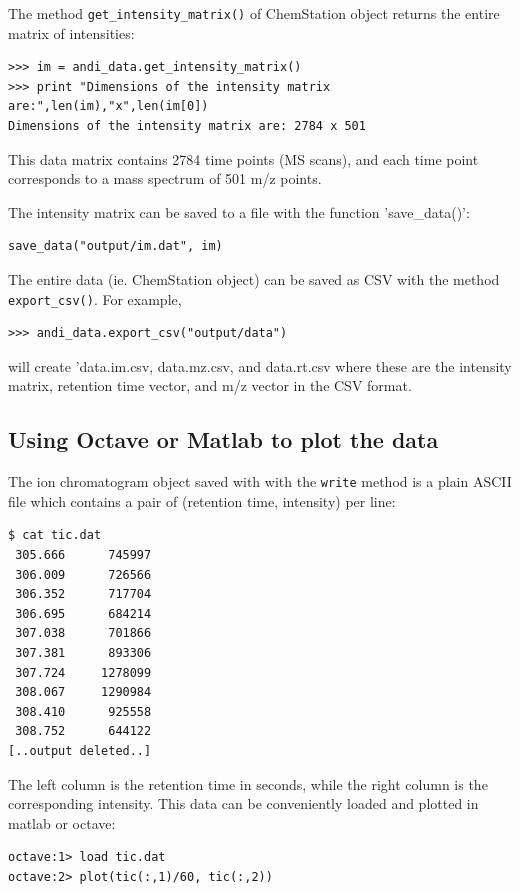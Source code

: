 The method {\tt get\_intensity\_matrix()} of ChemStation object returns
the entire matrix of intensities:

\begin{verbatim}
>>> im = andi_data.get_intensity_matrix()
>>> print "Dimensions of the intensity matrix are:",len(im),"x",len(im[0])
Dimensions of the intensity matrix are: 2784 x 501
\end{verbatim}

\noindent
This data matrix contains 2784 time points (MS scans), and each time point
corresponds to a mass spectrum of 501 m/z points.

The intensity matrix can be saved to a file with the function 'save\_data()':

\begin{verbatim}
save_data("output/im.dat", im)
\end{verbatim}

The entire data (ie. ChemStation object) can be saved as CSV with the method
{\tt export\_csv()}. For example,

\begin{verbatim}
>>> andi_data.export_csv("output/data")
\end{verbatim}

\noindent
will create 'data.im.csv, data.mz.csv, and data.rt.csv where these are the
intensity matrix, retention time vector, and m/z vector in the CSV format.

\subsection{Using Octave or Matlab to plot the data}

The ion chromatogram object saved with with the {\tt write{}} method is a
plain ASCII file which contains a pair of (retention time, intensity) per
line:

\begin{verbatim}
$ cat tic.dat
 305.666      745997
 306.009      726566
 306.352      717704
 306.695      684214
 307.038      701866
 307.381      893306
 307.724     1278099
 308.067     1290984
 308.410      925558
 308.752      644122
[..output deleted..]
\end{verbatim}

\noindent
The left column is the retention time in seconds, while the right column
is the corresponding intensity. This data can be conveniently loaded and
plotted in matlab or octave:

\begin{verbatim}
octave:1> load tic.dat
octave:2> plot(tic(:,1)/60, tic(:,2))
\end{verbatim}

